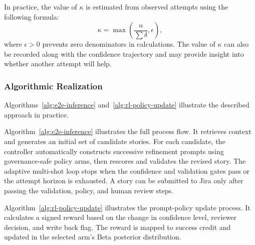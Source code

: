 \documentclass[manuscript,review]{acmart}
\begin{document}
In practice, the value of \(\kappa\) is estimated from observed attempts using the following formula:
\begin{equation}
\kappa = \max\left(\frac{n}{\sum \delta},\epsilon\right),
\end{equation}
where \(\epsilon>0\) prevents zero denominators in calculations.
The value of \(\kappa\) can also be recorded along with the confidence trajectory and may provide insight into whether another attempt will help.

\subsubsection{Algorithmic Realization}
Algorithms~\ref{alg:e2e-inference} and~\ref{alg:rl-policy-update}
illustrate the described approach in practice.

Algorithm~\ref{alg:e2e-inference} illustrates the full process flow.
It retrieves context and generates an initial set of candidate stories.
For each candidate, the controller automatically constructs successive refinement prompts using governance-safe policy arms, then rescores and validates the revised story. The adaptive multi-shot loop stops when the confidence and validation gates pass or the attempt horizon is exhausted.
A story can be submitted to Jira only after passing the validation, policy, and human review steps.

Algorithm~\ref{alg:rl-policy-update} illustrates the prompt-policy update process.
It calculates a signed reward based on the change in confidence level, reviewer decision, and write back flag.
The reward is mapped to success credit and updated in the selected arm's Beta posterior distribution.
\end{document}
